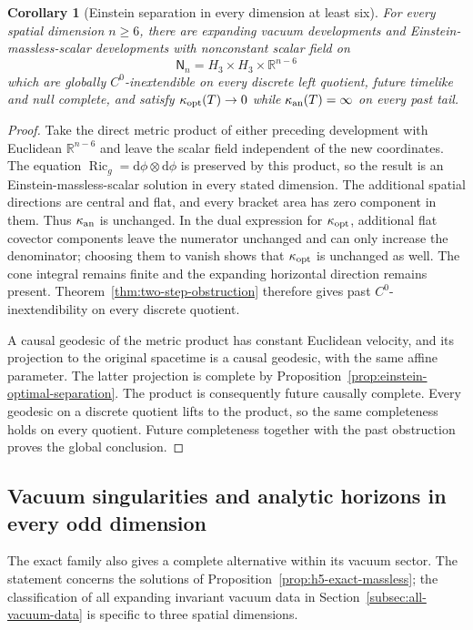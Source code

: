 \documentclass[10pt,a4paper]{article}
\numberwithin{equation}{section}
\newtheorem{corollary}[theorem]{Corollary}
\theoremstyle{definition}
\theoremstyle{remark}
\newcommand{\dd}{\mathrm d}
\begin{document}
\begin{corollary}[Einstein separation in every dimension at least six]
\label{cor:einstein-optimal-all-dimensions}
For every spatial dimension $n\ge6$, there are expanding vacuum
developments and Einstein-massless-scalar developments with
nonconstant scalar field on
\[
 \mathsf N_n=H_3\times H_3\times\mathbb R^{n-6}
\]
which are globally $C^0$-inextendible on every discrete left quotient,
future timelike and null complete, and satisfy
$\kappa_{\rm opt}(T)\to0$ while
$\kappa_{\rm an}(T)=\infty$ on every past tail.
\end{corollary}

\begin{proof}
Take the direct metric product of either preceding development with
Euclidean $\mathbb R^{n-6}$ and leave the scalar field independent
of the new coordinates.  The equation
$\operatorname{Ric}_g=\dd\phi\otimes\dd\phi$ is preserved by this
product, so the result is an Einstein-massless-scalar solution in
every stated dimension.  The additional spatial directions are
central and flat, and every bracket area has zero component in them.
Thus $\kappa_{\rm an}$ is unchanged.  In the dual expression for
$\kappa_{\rm opt}$, additional flat covector components leave the
numerator unchanged and can only increase the denominator; choosing
them to vanish shows that $\kappa_{\rm opt}$ is unchanged as well.
The cone integral remains finite and the expanding horizontal
direction remains present.  Theorem~\ref{thm:two-step-obstruction}
therefore gives past $C^0$-inextendibility on every discrete quotient.

A causal geodesic of the metric product has constant Euclidean
velocity, and its projection to the original spacetime is a causal
geodesic, with the same affine parameter.  The latter projection is
complete by Proposition~\ref{prop:einstein-optimal-separation}.
The product is consequently future causally complete.  Every
geodesic on a discrete quotient lifts to the product, so the same
completeness holds on every quotient.  Future completeness together
with the past obstruction proves the global conclusion.
\end{proof}

\subsection{Vacuum singularities and analytic horizons in every odd dimension}
\label{subsec:heisenberg-horizons}

The exact family also gives a complete alternative within its vacuum
sector.  The statement concerns the solutions of
Proposition~\ref{prop:h5-exact-massless}; the classification of all
expanding invariant vacuum data in Section~\ref{subsec:all-vacuum-data}
is specific to three spatial dimensions.
\end{document}
